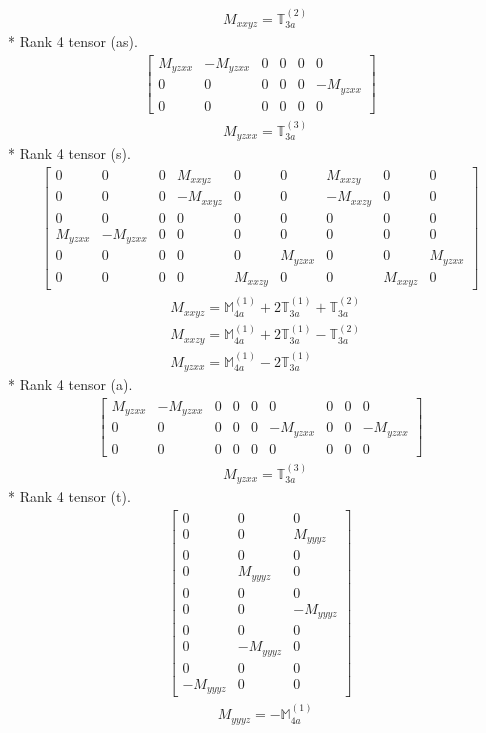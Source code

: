 \documentclass[fleqn,8pt,landscape]{jsarticle}
\begin{document}
\begin{align*}
& M_{xxyz} = \mathbb{T}_{3a}^{(2)}
\end{align*}
* Rank 4 tensor (as).
\begin{align*}
\begin{bmatrix} M_{yzxx} & - M_{yzxx} & 0 & 0 & 0 & 0 \\ 0 & 0 & 0 & 0 & 0 & - M_{yzxx} \\ 0 & 0 & 0 & 0 & 0 & 0 \end{bmatrix}
\end{align*}
\begin{align*}
& M_{yzxx} = \mathbb{T}_{3a}^{(3)}
\end{align*}
* Rank 4 tensor (s).
\begin{align*}
\begin{bmatrix} 0 & 0 & 0 & M_{xxyz} & 0 & 0 & M_{xxzy} & 0 & 0 \\ 0 & 0 & 0 & - M_{xxyz} & 0 & 0 & - M_{xxzy} & 0 & 0 \\ 0 & 0 & 0 & 0 & 0 & 0 & 0 & 0 & 0 \\ M_{yzxx} & - M_{yzxx} & 0 & 0 & 0 & 0 & 0 & 0 & 0 \\ 0 & 0 & 0 & 0 & 0 & M_{yzxx} & 0 & 0 & M_{yzxx} \\ 0 & 0 & 0 & 0 & M_{xxzy} & 0 & 0 & M_{xxyz} & 0 \end{bmatrix}
\end{align*}
\begin{align*}
& M_{xxyz} = \mathbb{M}_{4a}^{(1)} + 2 \mathbb{T}_{3a}^{(1)} + \mathbb{T}_{3a}^{(2)} \\
& M_{xxzy} = \mathbb{M}_{4a}^{(1)} + 2 \mathbb{T}_{3a}^{(1)} - \mathbb{T}_{3a}^{(2)} \\
& M_{yzxx} = \mathbb{M}_{4a}^{(1)} - 2 \mathbb{T}_{3a}^{(1)}
\end{align*}
* Rank 4 tensor (a).
\begin{align*}
\begin{bmatrix} M_{yzxx} & - M_{yzxx} & 0 & 0 & 0 & 0 & 0 & 0 & 0 \\ 0 & 0 & 0 & 0 & 0 & - M_{yzxx} & 0 & 0 & - M_{yzxx} \\ 0 & 0 & 0 & 0 & 0 & 0 & 0 & 0 & 0 \end{bmatrix}
\end{align*}
\begin{align*}
& M_{yzxx} = \mathbb{T}_{3a}^{(3)}
\end{align*}
* Rank 4 tensor (t).
\begin{align*}
\begin{bmatrix} 0 & 0 & 0 \\ 0 & 0 & M_{yyyz} \\ 0 & 0 & 0 \\ 0 & M_{yyyz} & 0 \\ 0 & 0 & 0 \\ 0 & 0 & - M_{yyyz} \\ 0 & 0 & 0 \\ 0 & - M_{yyyz} & 0 \\ 0 & 0 & 0 \\ - M_{yyyz} & 0 & 0 \end{bmatrix}
\end{align*}
\begin{align*}
& M_{yyyz} = - \mathbb{M}_{4a}^{(1)}
\end{align*}
\end{document}
